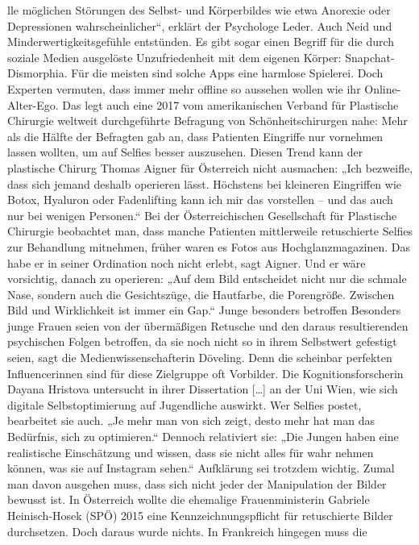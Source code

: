 lle möglichen Störungen des
Selbst- und Körperbildes wie
etwa Anorexie oder Depressionen
wahrscheinlicher“, erklärt der
Psychologe Leder. Auch Neid
und Minderwertigkeitsgefühle
entstünden. Es gibt sogar einen
Begriff für die durch soziale
Medien ausgelöste Unzufriedenheit mit dem eigenen Körper:
Snapchat-Dismorphia.
Für die meisten sind solche Apps
eine harmlose Spielerei. Doch
Experten vermuten, dass immer
mehr offline so aussehen wollen
wie ihr Online-Alter-Ego. Das
legt auch eine 2017 vom amerikanischen Verband für Plastische
Chirurgie weltweit durchgeführte
Befragung von Schönheitschirurgen nahe: Mehr als die
Hälfte der Befragten gab an, dass
Patienten Eingriffe nur vornehmen lassen wollten, um auf Selfies
besser auszusehen. Diesen Trend
kann der plastische Chirurg Thomas Aigner für Österreich nicht
ausmachen: „Ich bezweifle, dass
sich jemand deshalb operieren
lässt. Höchstens bei kleineren
Eingriffen wie Botox, Hyaluron
oder Fadenlifting kann ich mir
das vorstellen – und das auch nur
bei wenigen Personen.“
Bei der Österreichischen Gesellschaft für Plastische Chirurgie
beobachtet man, dass manche
Patienten mittlerweile retuschierte Selfies zur Behandlung
mitnehmen, früher waren es Fotos
aus Hochglanzmagazinen. Das
habe er in seiner Ordination noch
nicht erlebt, sagt Aigner. Und er
wäre vorsichtig, danach zu operieren: „Auf dem Bild entscheidet
nicht nur die schmale Nase, sondern auch die Gesichtszüge, die
Hautfarbe, die Porengröße. Zwischen Bild und Wirklichkeit ist
immer ein Gap.“
Junge besonders betroffen
Besonders junge Frauen seien von
der übermäßigen Retusche und
den daraus resultierenden psychischen Folgen betroffen, da sie
noch nicht so in ihrem Selbstwert
gefestigt seien, sagt die Medienwissenschafterin Döveling. Denn
die scheinbar perfekten Influencerinnen sind für diese Zielgruppe
oft Vorbilder. Die Kognitionsforscherin Dayana Hristova untersucht in ihrer Dissertation […]
an der Uni Wien, wie sich digitale
Selbstoptimierung auf Jugendliche auswirkt. Wer Selfies postet,
bearbeitet sie auch. „Je mehr man
von sich zeigt, desto mehr hat man
das Bedürfnis, sich zu optimieren.“ Dennoch relativiert sie: „Die
Jungen haben eine realistische
Einschätzung und wissen, dass sie
nicht alles für wahr nehmen können, was sie auf Instagram sehen.“
Aufklärung sei trotzdem wichtig.
Zumal man davon ausgehen muss,
dass sich nicht jeder der Manipulation der Bilder bewusst ist.
In Österreich wollte die ehemalige Frauenministerin Gabriele Heinisch-Hosek (SPÖ) 2015
eine Kennzeichnungspflicht für
retuschierte Bilder durchsetzen. Doch daraus wurde nichts.
In Frankreich hingegen muss die
